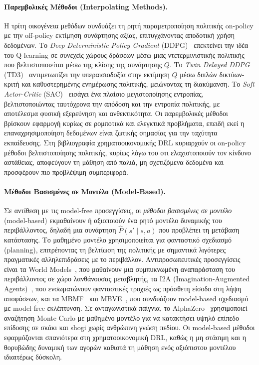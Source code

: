 \paragraph{Παρεμβολικές Μέθοδοι (Interpolating Methods).}
Η τρίτη οικογένεια μεθόδων συνδυάζει τη ρητή παραμετροποίηση πολιτικής on-policy με την
off-policy εκτίμηση συνάρτησης αξίας, επιτυγχάνοντας αποδοτική χρήση δεδομένων.
Το \emph{Deep Deterministic Policy Gradient} (DDPG)~\cite{lillicrap2015ddpg}
επεκτείνει την ιδέα του Q-learning σε συνεχείς χώρους δράσεων μέσω μιας
ντετερμινιστικής πολιτικής που βελτιστοποιείται μέσω της κλίσης της συνάρτησης
$Q$. Το \emph{Twin Delayed DDPG} (TD3)~\cite{fujimoto2018td3} αντιμετωπίζει
την υπεραισιοδοξία στην εκτίμηση $Q$ μέσω διπλών δικτύων-κριτή και
καθυστερημένης ενημέρωσης πολιτικής, μειώνοντας τη διακύμανση. Το \emph{Soft
Actor-Critic} (SAC)~\cite{haarnoja2018sac} εισάγει ένα πλαίσιο μεγιστοποίησης
εντροπίας, βελτιστοποιώντας ταυτόχρονα την απόδοση και την εντροπία πολιτικής,
με αποτέλεσμα φυσική εξερεύνηση και ανθεκτικότητα. Οι παρεμβολικές μέθοδοι
βρίσκουν εφαρμογή κυρίως σε ρομποτικά και ελεγκτικά προβλήματα, επειδή εκεί 
η επαναχρησιμοποίηση δεδομένων είναι ζωτικής σημασίας για την ταχύτητα εκπαίδευσης.
Στη βιβλιογραφία χρηματοοικονομικής DRL κυριαρχούν οι on-policy μέθοδοι
βελτιστοποίησης πολιτικής, κυρίως λόγω του οτι ελαχιστοποιούν τον κίνδυνο αστάθειας, 
αποφεύγουν τη μάθηση από παλιά, μη σχετιζόμενα δεδομένα και προσφέρουν πιο 
προβλέψιμη συμπεριφορά.

\paragraph{Μέθοδοι Βασισμένες σε Μοντέλο (Model-Based).}
Σε αντίθεση με τις model-free προσεγγίσεις, οι \emph{μέθοδοι βασισμένες σε
μοντέλο} (model-based) εκμαθαίνουν ή αξιοποιούν ένα ρητό μοντέλο δυναμικής
του περιβάλλοντος, δηλαδή μια συνάρτηση $\hat{P}(s' \mid s, a)$ που προβλέπει
τη μετάβαση κατάστασης. Το μαθημένο μοντέλο χρησιμοποιείται για φανταστικό
σχεδιασμό (planning), επιτρέποντας τη βελτίωση της πολιτικής με σημαντικά
λιγότερες πραγματικές αλληλεπιδράσεις με το περιβάλλον. Αντιπροσωπευτικές
προσεγγίσεις είναι τα World Models~\cite{ha2018worldmodels}, που μαθαίνουν
μια συμπυκνωμένη αναπαράσταση του περιβάλλοντος σε χώρο λανθάνουσας
μεταβλητής, τα I2A (Imagination-Augmented Agents)~\cite{weber2017i2a}, που
ενσωματώνουν φανταστικές τροχιές ως πρόσθετη είσοδο στη λήψη αποφάσεων, και
τα MBMF~\cite{nagabandi2018mbmf} και MBVE~\cite{feinberg2018mbve}, που συνδυάζουν
model-based σχεδιασμό με model-free εκλέπτυνση. Σε ανταγωνιστικά παίγνια, το
AlphaZero~\cite{silver2017alphazero} χρησιμοποιεί αναζήτηση Monte Carlo με
μαθημένο μοντέλο για να κατακτήσει υψηλό επίπεδο επίδοσης σε σκάκι και
shogi χωρίς ανθρώπινη γνώση πεδίου. Οι model-based μέθοδοι εφαρμόζονται
σπανιότερα στη χρηματοοικονομική DRL, καθώς η μη στάσιμη και η θορυβώδης δυναμική
των αγορών καθιστά τη μάθηση ενός αξιόπιστου μοντέλου ιδιαιτέρως δύσκολη.

